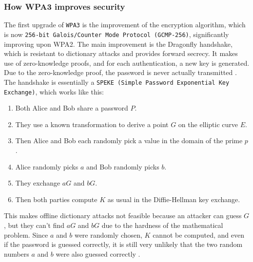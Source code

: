 \documentclass[a4paper]{article}
\begin{document}
\subsubsection{How WPA3 improves security}
The first upgrade of \texttt{WPA3} is the improvement of the encryption algorithm, which is now \texttt{256-bit Galois/Counter Mode Protocol (GCMP-256)}, significantly improving upon WPA2. \nl \nl
The main improvement is the Dragonfly handshake, which is resistant to dictionary attacks and provides forward secrecy. It makes use of zero-knowledge proofs, and for each authentication, a new key is generated. Due to the zero-knowledge proof, the password is never actually transmitted \cite{noauthor_wpa3_nodate}. \nl
The handshake is essentially a \texttt{SPEKE (Simple Password Exponential Key Exchange)}, which works like this: \nl
\begin{enumerate}
    \item Both Alice and Bob share a password \( P \).
    \item They use a known transformation to derive a point \( G \) on the elliptic curve \( E \).
    \item Then Alice and Bob each randomly pick a value in the domain of the prime \( p \).
    \item Alice randomly picks \( a \) and Bob randomly picks \( b \).
    \item They exchange \( aG \) and \( bG \).
    \item Then both parties compute \( K \) as usual in the Diffie-Hellman key exchange.
\end{enumerate} \nl
This makes offline dictionary attacks not feasible because an attacker can guess \( G \), but they can't find \( aG \) and \( bG \) due to the hardness of the mathematical problem. Since \( a \) and \( b \) were randomly chosen, \( K \) cannot be computed, and even if the password is guessed correctly, it is still very unlikely that the two random numbers \( a \) and \( b \) were also guessed correctly \cite{noauthor_wpa3_nodate}.
\end{document}
